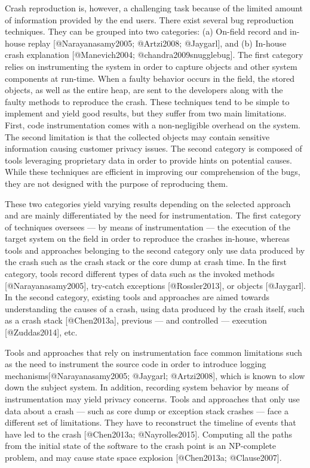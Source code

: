 Crash reproduction is, however, a challenging task because of the
limited amount of information provided by the end users. There exist
several bug reproduction techniques. They can be grouped into two
categories: (a) On-field record and in-house replay
{[}@Narayanasamy2005; @Artzi2008; @Jaygarl{]}, and (b) In-house crash
explanation {[}@Manevich2004; @chandra2009snugglebug{]}. The first
category relies on instrumenting the system in order to capture objects
and other system components at run-time. When a faulty behavior occurs
in the field, the stored objects, as well as the entire heap, are sent
to the developers along with the faulty methods to reproduce the crash.
These techniques tend to be simple to implement and yield good results,
but they suffer from two main limitations. First, code instrumentation
comes with a non-negligible overhead on the system. The second
limitation is that the collected objects may contain sensitive
information causing customer privacy issues. The second category is
composed of tools leveraging proprietary data in order to provide hints
on potential causes. While these techniques are efficient in improving
our comprehension of the bugs, they are not designed with the purpose of
reproducing them.

These two categories yield varying results depending on the selected
approach and are mainly differentiated by the need for instrumentation.
The first category of techniques oversees --- by means of
instrumentation --- the execution of the target system on the field in
order to reproduce the crashes in-house, whereas tools and approaches
belonging to the second category only use data produced by the crash
such as the crash stack or the core dump at crash time. In the first
category, tools record different types of data such as the invoked
methods {[}@Narayanasamy2005{]}, try-catch exceptions
{[}@Rossler2013{]}, or objects {[}@Jaygarl{]}. In the second category,
existing tools and approaches are aimed towards understanding the causes
of a crash, using data produced by the crash itself, such as a crash
stack {[}@Chen2013a{]}, previous --- and controlled --- execution
{[}@Zuddas2014{]}, etc.

Tools and approaches that rely on instrumentation face common
limitations such as the need to instrument the source code in order to
introduce logging mechanisms{[}@Narayanasamy2005; @Jaygarl;
@Artzi2008{]}, which is known to slow down the subject system. In
addition, recording system behavior by means of instrumentation may
yield privacy concerns. Tools and approaches that only use data about a
crash --- such as core dump or exception stack crashes --- face a
different set of limitations. They have to reconstruct the timeline of
events that have led to the crash {[}@Chen2013a; @Nayrolles2015{]}.
Computing all the paths from the initial state of the software to the
crash point is an NP-complete problem, and may cause state space
explosion {[}@Chen2013a; @Clause2007{]}.

